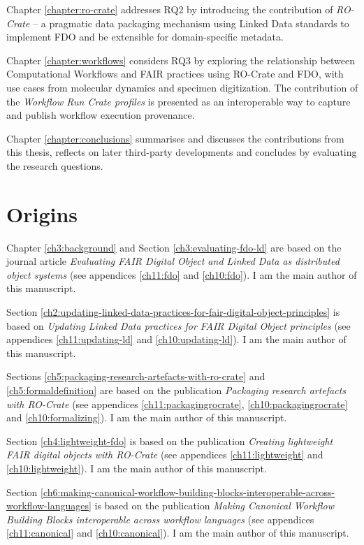Chapter \vref{chapter:ro-crate} addresses RQ2 by introducing the contribution of \emph{RO-Crate} -- a pragmatic data packaging mechanism using Linked Data standards to implement FDO and be extensible for domain-specific metadata.  

Chapter \vref{chapter:workflows} considers RQ3 by exploring the relationship between Computational Workflows and FAIR practices using RO-Crate and FDO, with use cases from molecular dynamics and specimen digitization. The contribution of the \emph{Workflow Run Crate profiles} is presented as an interoperable way to capture and publish workflow execution provenance. 

Chapter \vref{chapter:conclusions} summarises and discusses the contributions from this thesis, reflects on later third-party developments and concludes by evaluating the research questions.


\section{Origins}
\label{intro:origins}

Chapter \ref{ch3:background} and Section \ref{ch3:evaluating-fdo-ld} are based on the journal article \emph{Evaluating FAIR Digital Object and Linked Data as distributed object systems} \cite{Soiland-Reyes 2024b}  (see appendices \ref{ch11:fdo} and \ref{ch10:fdo}). I am the main author of this manuscript.

Section \ref{ch2:updating-linked-data-practices-for-fair-digital-object-principles} is based on \emph{Updating Linked Data practices for FAIR Digital Object principles} \cite{Soiland-Reyes 2022d} (see appendices \ref{ch11:updating-ld} and \ref{ch10:updating-ld}). I am the main author of this manuscript.

Sections \ref{ch5:packaging-research-artefacts-with-ro-crate} and \ref{ch5:formaldefinition} are based on the publication \emph{Packaging research artefacts with RO-Crate} \cite{Soiland-Reyes 2022a} (see appendices \ref{ch11:packagingrocrate}, \ref{ch10:packagingrocrate} and \ref{ch10:formalizing}). I am the main author of this manuscript.

Section \ref{ch4:lightweight-fdo} is based on the publication \emph{Creating lightweight FAIR digital objects with RO-Crate} \cite{Soiland-Reyes 2022c} (see appendices \ref{ch11:lightweight} and \ref{ch10:lightweight}). I am the main author of this manuscript.

Section \ref{ch6:making-canonical-workflow-building-blocks-interoperable-across-workflow-languages} is based on the publication \emph{Making Canonical Workflow Building Blocks interoperable across workflow languages} \cite{Soiland-Reyes 2022b} (see appendices \ref{ch11:canonical} and \ref{ch10:canonical}). I am the main author of this manuscript.

